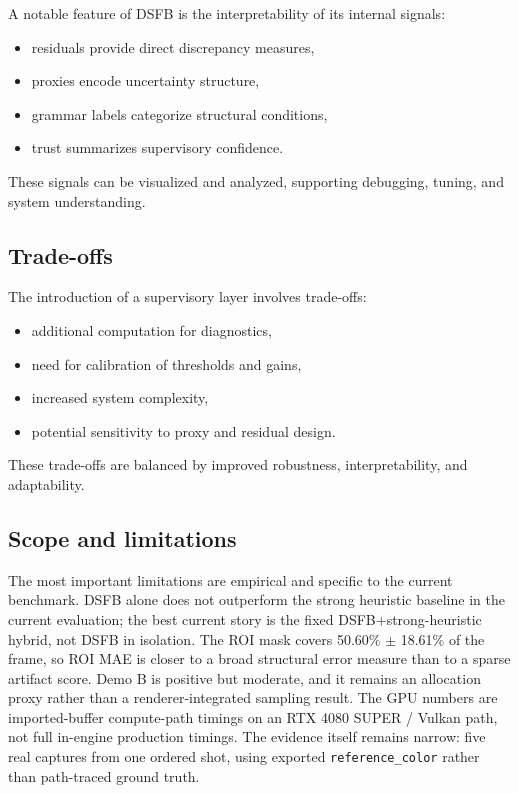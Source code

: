 \documentclass[11pt]{article}
\theoremstyle{definition}
\theoremstyle{plain}
\begin{document}
A notable feature of DSFB is the interpretability of its internal signals:

\begin{itemize}[leftmargin=1.5em]
    \item residuals provide direct discrepancy measures,
    \item proxies encode uncertainty structure,
    \item grammar labels categorize structural conditions,
    \item trust summarizes supervisory confidence.
\end{itemize}

These signals can be visualized and analyzed, supporting debugging, tuning, and system understanding.


\subsection{Trade-offs}

The introduction of a supervisory layer involves trade-offs:

\begin{itemize}[leftmargin=1.5em]
    \item additional computation for diagnostics,
    \item need for calibration of thresholds and gains,
    \item increased system complexity,
    \item potential sensitivity to proxy and residual design.
\end{itemize}

These trade-offs are balanced by improved robustness, interpretability, and adaptability.


\subsection{Scope and limitations}

The most important limitations are empirical and specific to the current benchmark. DSFB alone does not outperform the strong heuristic baseline in the current evaluation; the best current story is the fixed DSFB+strong-heuristic hybrid, not DSFB in isolation. The ROI mask covers 50.60\% $\pm$ 18.61\% of the frame, so ROI MAE is closer to a broad structural error measure than to a sparse artifact score. Demo B is positive but moderate, and it remains an allocation proxy rather than a renderer-integrated sampling result. The GPU numbers are imported-buffer compute-path timings on an RTX 4080 SUPER / Vulkan path, not full in-engine production timings. The evidence itself remains narrow: five real captures from one ordered shot, using exported \texttt{reference\_color} rather than path-traced ground truth.
\end{document}
